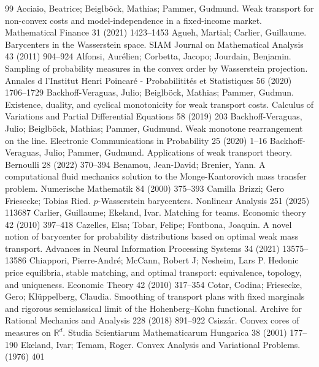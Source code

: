 \documentclass[10pt,a4paper]{amsart}
\begin{document}
\begin{thebibliography}{99}
 Acciaio, Beatrice; Beiglb{\"o}ck, Mathias; Pammer, Gudmund. Weak transport for non-convex costs and model-independence in a fixed-income market. Mathematical Finance 31 (2021) 1423--1453
 Agueh, Martial; Carlier, Guillaume. Barycenters in the {W}asserstein space. SIAM Journal on Mathematical Analysis 43 (2011) 904--924
 Alfonsi, Aur{\'e}lien; Corbetta, Jacopo; Jourdain, Benjamin. Sampling of probability measures in the convex order by {W}asserstein projection. Annales d l'Institut Henri Poincaré - Probabilitités et Statistiques 56 (2020) 1706--1729
 Backhoff-Veraguas, Julio; Beiglb{\"o}ck, Mathias; Pammer, Gudmun. Existence, duality, and cyclical monotonicity for weak transport costs. Calculus of Variations and Partial Differential Equations 58 (2019) 203
 Backhoff-Veraguas, Julio; Beiglb{\"o}ck, Mathias; Pammer, Gudmund. Weak monotone rearrangement on the line. Electronic Communications in Probability 25 (2020) 1--16
 Backhoff-Veraguas, Julio; Pammer, Gudmund. Applications of weak transport theory. Bernoulli 28 (2022) 370--394
 Benamou, Jean-David; Brenier, Yann. A computational fluid mechanics solution to the {M}onge-{K}antorovich mass transfer problem. Numerische Mathematik 84 (2000) 375--393
 Camilla Brizzi; Gero Friesecke; Tobias Ried. $p$-{W}asserstein barycenters. Nonlinear Analysis 251 (2025) 113687
 Carlier, Guillaume; Ekeland, Ivar. Matching for teams. Economic theory 42 (2010) 397--418
 Cazelles, Elsa; Tobar, Felipe; Fontbona, Joaquin. A novel notion of barycenter for probability distributions based on optimal weak mass transport. Advances in Neural Information Processing Systems 34 (2021) 13575--13586
 Chiappori, Pierre-Andr{\'e}; McCann, Robert J; Nesheim, Lars P. Hedonic price equilibria, stable matching, and optimal transport: equivalence, topology, and uniqueness. Economic Theory 42 (2010) 317--354
 Cotar, Codina; Friesecke, Gero; Kl{\"u}ppelberg, Claudia. Smoothing of transport plans with fixed marginals and rigorous semiclassical limit of the {H}ohenberg--{K}ohn functional. Archive for Rational Mechanics and Analysis 228 (2018) 891--922
 Csisz{\'a}r. Convex cores of measures on $\mathbb{R}^d$. Studia Scientiarum Mathematicarum Hungarica 38 (2001) 177--190
 Ekeland, Ivar; Temam, Roger. Convex Analysis and Variational Problems. (1976) 401

\end{thebibliography}
\end{document}
